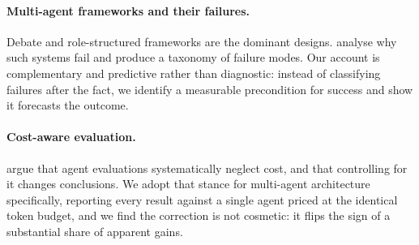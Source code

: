 \paragraph{Multi-agent frameworks and their failures.}
Debate \citep{du2023debate} and role-structured frameworks
\citep{wu2023autogen,hong2024metagpt,qian2024chatdev} are the dominant designs.
\citet{cemri2025why} analyse why such systems fail and produce a taxonomy of
failure modes. Our account is complementary and predictive rather than
diagnostic: instead of classifying failures after the fact, we identify a
measurable precondition for success and show it forecasts the outcome.

\paragraph{Cost-aware evaluation.}
\citet{kapoor2024agents} argue that agent evaluations systematically neglect
cost, and that controlling for it changes conclusions. We adopt that stance for
multi-agent architecture specifically, reporting every result against a single
agent priced at the identical token budget, and we find the correction is not
cosmetic: it flips the sign of a substantial share of apparent gains.
